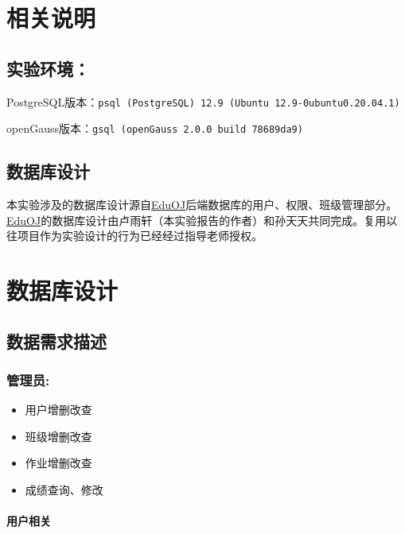 \documentclass{ctexrep}
\begin{document}


\tableofcontents
\clearpage
\chapter*{相关说明}
\section*{实验环境：}
PostgreSQL版本：\texttt{psql (PostgreSQL) 12.9 (Ubuntu 12.9-0ubuntu0.20.04.1)}

openGauss版本：\texttt{gsql (openGauss 2.0.0 build 78689da9)}

\section*{数据库设计}

本实验涉及的数据库设计源自\href{https://github.com/EduOJ/backend}{EduOJ}后端数据库的用户、权限、班级管理部分。\href{https://github.com/EduOJ/backend}{EduOJ}的数据库设计由卢雨轩（本实验报告的作者）和孙天天共同完成。复用以往项目作为实验设计的行为已经经过指导老师授权。

\chapter*{数据库设计}

\section{数据需求描述}

\subsection{管理员:}

\begin{itemize}
\item
  用户增删改查
\item
  班级增删改查
\item
  作业增删改查
\item
  成绩查询、修改
\end{itemize}

\hypertarget{ux7528ux6237ux76f8ux5173}{%
\subsubsection{用户相关}\label{ux7528ux6237ux76f8ux5173}}
\end{document}
